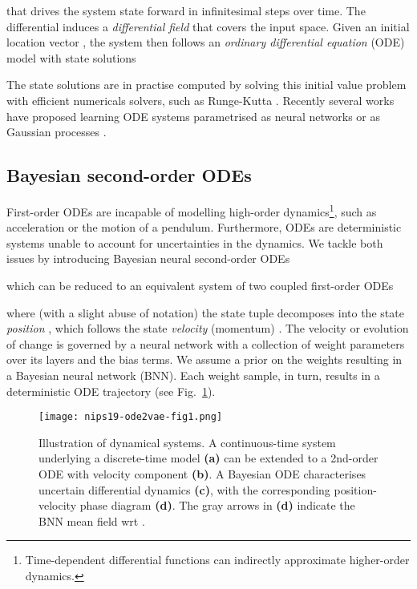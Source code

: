 \documentclass{article}
\newcommand{\0}{\mathbf{0}}
\begin{document}
that drives the system state forward in infinitesimal steps over time. The differential  induces a \emph{differential field} that covers the input space. Given an initial location vector , the system then follows an \emph{ordinary differential equation} (ODE) model with state solutions

The state solutions are in practise computed by solving this initial value problem with efficient numericals solvers, such as Runge-Kutta \citep{schober2019probabilistic}. Recently several works have proposed learning ODE systems  parametrised as neural networks \citep{chen2018neural} or as Gaussian processes \citep{heinonen18a}.


\subsection{Bayesian second-order ODEs} \label{sec:bsoode}

First-order ODEs are incapable of modelling high-order dynamics\footnote{Time-dependent differential functions  can indirectly approximate higher-order dynamics.}, such as acceleration or the motion of a pendulum. Furthermore, ODEs are deterministic systems unable to account for uncertainties in the dynamics. We tackle both issues by introducing Bayesian neural second-order ODEs

which can be reduced to an equivalent system of two coupled first-order ODEs

where (with a slight abuse of notation) the state tuple  decomposes into the state \emph{position} , which follows the state \emph{velocity} (momentum) . The velocity or evolution of change is governed by a neural network  with a collection of weight parameters  over its  layers and the bias terms. We assume a prior  on the weights resulting in a Bayesian neural network (BNN). Each weight sample, in turn, results in a deterministic ODE trajectory (see Fig.~\ref{fig:odes}).
\begin{figure}[t]
    \centering
    \texttt{[image: nips19-ode2vae-fig1.png]}
    \caption{Illustration of dynamical systems. A continuous-time system underlying a discrete-time model \textbf{(a)} can be extended to a 2nd-order ODE with velocity component \textbf{(b)}. A Bayesian ODE characterises uncertain differential dynamics \textbf{(c)}, with the corresponding position-velocity phase diagram \textbf{(d)}. The gray arrows in \textbf{(d)} indicate the BNN  mean field wrt .}
    \label{fig:odes}
\end{figure}
\end{document}

